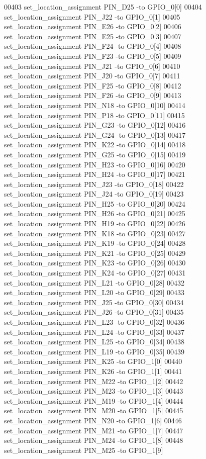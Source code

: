 \begin{DoxyCode}
00403 set\_location\_assignment PIN\_D25 -to GPIO\_0[0]
00404 set\_location\_assignment PIN\_J22 -to GPIO\_0[1]
00405 set\_location\_assignment PIN\_E26 -to GPIO\_0[2]
00406 set\_location\_assignment PIN\_E25 -to GPIO\_0[3]
00407 set\_location\_assignment PIN\_F24 -to GPIO\_0[4]
00408 set\_location\_assignment PIN\_F23 -to GPIO\_0[5]
00409 set\_location\_assignment PIN\_J21 -to GPIO\_0[6]
00410 set\_location\_assignment PIN\_J20 -to GPIO\_0[7]
00411 set\_location\_assignment PIN\_F25 -to GPIO\_0[8]
00412 set\_location\_assignment PIN\_F26 -to GPIO\_0[9]
00413 set\_location\_assignment PIN\_N18 -to GPIO\_0[10]
00414 set\_location\_assignment PIN\_P18 -to GPIO\_0[11]
00415 set\_location\_assignment PIN\_G23 -to GPIO\_0[12]
00416 set\_location\_assignment PIN\_G24 -to GPIO\_0[13]
00417 set\_location\_assignment PIN\_K22 -to GPIO\_0[14]
00418 set\_location\_assignment PIN\_G25 -to GPIO\_0[15]
00419 set\_location\_assignment PIN\_H23 -to GPIO\_0[16]
00420 set\_location\_assignment PIN\_H24 -to GPIO\_0[17]
00421 set\_location\_assignment PIN\_J23 -to GPIO\_0[18]
00422 set\_location\_assignment PIN\_J24 -to GPIO\_0[19]
00423 set\_location\_assignment PIN\_H25 -to GPIO\_0[20]
00424 set\_location\_assignment PIN\_H26 -to GPIO\_0[21]
00425 set\_location\_assignment PIN\_H19 -to GPIO\_0[22]
00426 set\_location\_assignment PIN\_K18 -to GPIO\_0[23]
00427 set\_location\_assignment PIN\_K19 -to GPIO\_0[24]
00428 set\_location\_assignment PIN\_K21 -to GPIO\_0[25]
00429 set\_location\_assignment PIN\_K23 -to GPIO\_0[26]
00430 set\_location\_assignment PIN\_K24 -to GPIO\_0[27]
00431 set\_location\_assignment PIN\_L21 -to GPIO\_0[28]
00432 set\_location\_assignment PIN\_L20 -to GPIO\_0[29]
00433 set\_location\_assignment PIN\_J25 -to GPIO\_0[30]
00434 set\_location\_assignment PIN\_J26 -to GPIO\_0[31]
00435 set\_location\_assignment PIN\_L23 -to GPIO\_0[32]
00436 set\_location\_assignment PIN\_L24 -to GPIO\_0[33]
00437 set\_location\_assignment PIN\_L25 -to GPIO\_0[34]
00438 set\_location\_assignment PIN\_L19 -to GPIO\_0[35]
00439 set\_location\_assignment PIN\_K25 -to GPIO\_1[0]
00440 set\_location\_assignment PIN\_K26 -to GPIO\_1[1]
00441 set\_location\_assignment PIN\_M22 -to GPIO\_1[2]
00442 set\_location\_assignment PIN\_M23 -to GPIO\_1[3]
00443 set\_location\_assignment PIN\_M19 -to GPIO\_1[4]
00444 set\_location\_assignment PIN\_M20 -to GPIO\_1[5]
00445 set\_location\_assignment PIN\_N20 -to GPIO\_1[6]
00446 set\_location\_assignment PIN\_M21 -to GPIO\_1[7]
00447 set\_location\_assignment PIN\_M24 -to GPIO\_1[8]
00448 set\_location\_assignment PIN\_M25 -to GPIO\_1[9]

\end{DoxyCode}
